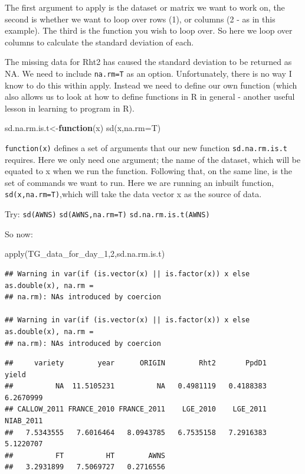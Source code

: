 \documentclass[
]{book}
\newenvironment{Shaded}{\begin{snugshade}}{\end{snugshade}}
\newcommand{\AttributeTok}[1]{\textcolor[rgb]{0.77,0.63,0.00}{#1}}
\newcommand{\ControlFlowTok}[1]{\textcolor[rgb]{0.13,0.29,0.53}{\textbf{#1}}}
\newcommand{\DecValTok}[1]{\textcolor[rgb]{0.00,0.00,0.81}{#1}}
\newcommand{\FunctionTok}[1]{\textcolor[rgb]{0.00,0.00,0.00}{#1}}
\newcommand{\NormalTok}[1]{#1}
\newcommand{\OtherTok}[1]{\textcolor[rgb]{0.56,0.35,0.01}{#1}}
\begin{document}
The first argument to apply is the dataset or matrix we want to work on, the second is whether we want to loop over rows (1), or columns (2 - as in this example). The third is the function you wish to loop over. So here we loop over columns to calculate the standard deviation of each.

The missing data for Rht2 has caused the standard deviation to be returned as NA. We need to include \texttt{na.rm=T} as an option. Unfortunately, there is no way I know to do this within apply. Instead we need to define our own function (which also allows us to look at how to define functions in R in general - another useful lesson in learning to program in R).

\begin{Shaded}
\begin{Highlighting}[]
\NormalTok{sd.na.rm.is.t}\OtherTok{\textless{}{-}}\ControlFlowTok{function}\NormalTok{(x) }\FunctionTok{sd}\NormalTok{(x,}\AttributeTok{na.rm=}\NormalTok{T)}
\end{Highlighting}
\end{Shaded}

\texttt{function(x)} defines a set of arguments that our new function \texttt{sd.na.rm.is.t} requires. Here we only need one argument; the name of the dataset, which will be equated to x when we run the function. Following that, on the same line, is the set of commands we want to run. Here we are running an inbuilt function, \texttt{sd(x,na.rm=T)},which will take the data vector x as the source of data.

Try:
\texttt{sd(AWNS)}
\texttt{sd(AWNS,na.rm=T)}
\texttt{sd.na.rm.is.t(AWNS)}

So now:

\begin{Shaded}
\begin{Highlighting}[]
\FunctionTok{apply}\NormalTok{(TG\_data\_for\_day\_1,}\DecValTok{2}\NormalTok{,sd.na.rm.is.t)}
\end{Highlighting}
\end{Shaded}

\begin{verbatim}
## Warning in var(if (is.vector(x) || is.factor(x)) x else as.double(x), na.rm =
## na.rm): NAs introduced by coercion

## Warning in var(if (is.vector(x) || is.factor(x)) x else as.double(x), na.rm =
## na.rm): NAs introduced by coercion
\end{verbatim}

\begin{verbatim}
##     variety        year      ORIGIN        Rht2       PpdD1       yield 
##          NA  11.5105231          NA   0.4981119   0.4188383   6.2670999 
## CALLOW_2011 FRANCE_2010 FRANCE_2011    LGE_2010    LGE_2011   NIAB_2011 
##   7.5343555   7.6016464   8.0943785   6.7535158   7.2916383   5.1220707 
##          FT          HT        AWNS 
##   3.2931899   7.5069727   0.2716556
\end{verbatim}
\end{document}
